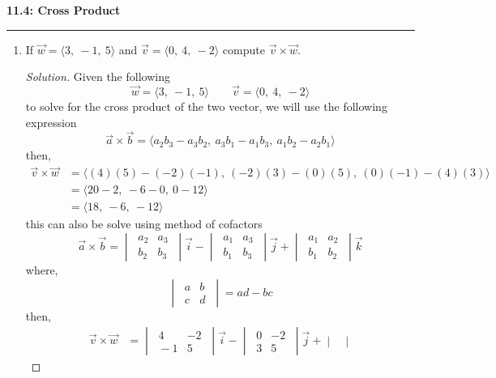 \documentclass[12pt]{article}
\begin{document}
	\noindent
	{\Large \textbf{11.4: Cross Product}} \\
	\hrule
		\begin{enumerate}
			\item[1.)] If \(\vec{w} = \langle 3,~-1,~5\rangle\) and \(\vec{v} = \langle 0,~4,~-2\rangle\) compute \(\vec{v} \times \vec{w}\).
				\begin{proof}[Solution]
					Given the following
					\[\vec{w} = \langle 3,~-1,~5\rangle\qquad \vec{v} = \langle 0,~4,~-2\rangle\]
					to solve for the cross product of the two vector, we will use the following expression
					\[\vec{a}\times\vec{b} = \langle a_2b_3-a_3b_2,~a_3b_1-a_1b_3,~a_1b_2-a_2b_1\rangle\]
					then,
					\begin{align*}
						\vec{v}\times\vec{w} & = \langle \left(4\right)\left(5\right)-\left(-2\right)\left(-1\right),~\left(-2\right)\left(3\right)-\left(0\right)\left(5\right),~\left(0\right)\left(-1\right)-\left(4\right)\left(3\right)\rangle \\
						& = \langle 20-2,~-6-0,~0-12\rangle \\
						& = \langle 18,~-6,~-12\rangle
					\end{align*}
					this can also be solve using method of cofactors
					\[\vec{a}\times\vec{b} = \begin{vmatrix}
						~ a_2 & a_3 ~ \\
						~ b_2 & b_3 ~ 
					\end{vmatrix}\vec{i} - \begin{vmatrix}
						~ a_1 & a_3 ~ \\
						~ b_1 & b_3 ~
					\end{vmatrix}\vec{j} + \begin{vmatrix}
						~ a_1 & a_2 ~ \\
						~ b_1 & b_2 ~
					\end{vmatrix} \vec{k}\]
					where,
					\[\begin{vmatrix}
						~a & b~ \\
						~c & d~
					\end{vmatrix} = ad-bc\]
					then,
					\begin{align*}
						\vec{v}\times\vec{w} & = \begin{vmatrix}
							~4 & -2 ~ \\
							~-1 & 5~
						\end{vmatrix}\vec{i} - \begin{vmatrix}
							~0 & -2~ \\
							~ 3&5~
						\end{vmatrix}\vec{j} + \begin{vmatrix}

\end{vmatrix}
\end{align*}
\end{proof}
\end{enumerate}
\end{document}
